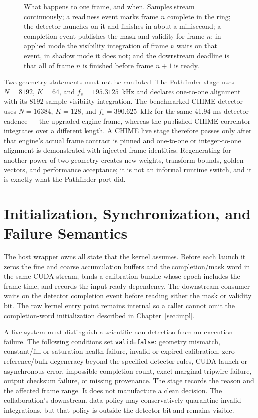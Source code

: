 \begin{figure}[t]
\centering
\resizebox{\linewidth}{!}{}
\caption[Frame timing: readiness, launch, completion, deadline]{What happens to one frame, and when. Samples stream continuously; a readiness event marks frame $n$ complete in the ring; the detector launches on it and finishes in about a millisecond; a completion event publishes the mask and validity for frame $n$; in applied mode the visibility integration of frame $n$ waits on that event, in shadow mode it does not; and the downstream deadline is that all of frame $n$ is finished before frame $n{+}1$ is ready.}
\label{fig:deployment:timing}
\end{figure}

Two geometry statements must not be conflated.  The Pathfinder stage uses
$N=8192$, $K=64$, and $f_s=195.3125$~kHz and declares one-to-one alignment
with its $8192$-sample visibility integration.  The benchmarked CHIME detector
uses $N=16384$, $K=128$, and $f_s=390.625$~kHz for the same 41.94-ms detector
cadence --- the upgraded-engine frame, whereas the published CHIME correlator
integrates over a different length.  A CHIME live stage therefore passes only
after that engine's actual frame contract is pinned and one-to-one or
integer-to-one alignment is demonstrated with injected frame identities.
Regenerating for another power-of-two geometry creates new weights, transform
bounds, golden vectors, and performance acceptance; it is not an informal
runtime switch, and it is exactly what the Pathfinder port did.

\section{Initialization, Synchronization, and Failure Semantics}
\label{sec:deployment:failure}

The host wrapper owns all state that the kernel assumes.  Before each launch it
zeros the fine and coarse accumulation buffers and the completion/mask word in
the same CUDA stream, binds a calibration bundle whose epoch includes the frame
time, and records the input-ready dependency.  The downstream consumer waits on
the detector completion event before reading either the mask or validity bit.
The raw kernel entry point remains internal so a caller cannot omit the
completion-word initialization described in Chapter~\ref{sec:impl}.

A live system must distinguish a scientific non-detection from an execution
failure.  The following conditions set \texttt{valid=false}: geometry mismatch,
constant/fill or saturation health failure, invalid or expired calibration,
zero-reference/bulk degeneracy beyond the
specified detector rules, CUDA launch or asynchronous error, impossible
completion count, exact-marginal tripwire failure, output checksum failure, or
missing provenance.  The stage records the reason and the affected frame range.
It does not manufacture a clean decision.  The collaboration's downstream data
policy may conservatively quarantine invalid integrations, but that policy is
outside the detector bit and remains visible.

